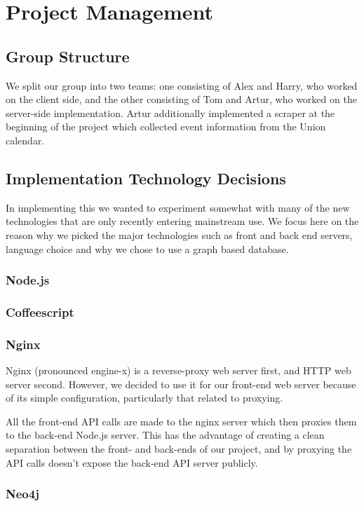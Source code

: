 \documentclass[11pt]{article}
\begin{document}
\section {Project Management}	

\subsection {Group Structure}

We split our group into two teams: one consisting of Alex and Harry, who worked on the client side, and the other consisting of Tom and Artur, who worked on the server-side implementation. Artur additionally implemented a scraper at the beginning of the project which collected event information from the Union calendar.

\subsection {Implementation Technology Decisions}

In implementing this we wanted to experiment somewhat with many of the new technologies that are only recently entering mainstream use. We focus here on the reason why we picked the major technologies such as front and back end servers, language choice and why we chose to use a graph based database.

\subsubsection {Node.js}
\subsubsection {Coffeescript}
\subsubsection {Nginx}
Nginx (pronounced engine-x) is a reverse-proxy web server first, and HTTP web server second. However, we decided to use it for our front-end web server because of its simple configuration, particularly that related to proxying. 

All the front-end API calls are made to the nginx server which then proxies them to the back-end Node.js server. This has the advantage of creating a clean separation between the front- and back-ends of our project, and by proxying the API calls doesn't expose the back-end API server publicly. 
\subsubsection {Neo4j}
\end{document}
